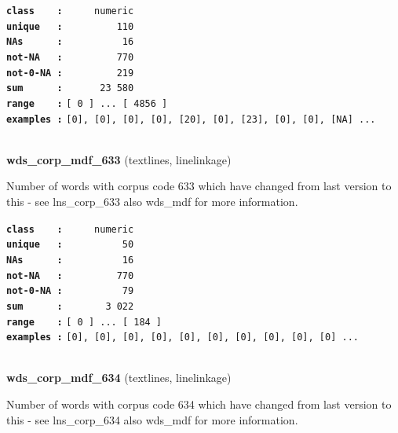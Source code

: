 \documentclass[]{article}
\begin{document}
\textbf{\texttt{class\ \ \ \ :}} \texttt{~~~~~numeric}\\
\textbf{\texttt{unique\ \ \ :}} \texttt{~~~~~~~~~110}\\
\textbf{\texttt{NAs\ \ \ \ \ \ :}} \texttt{~~~~~~~~~~16}\\
\textbf{\texttt{not-NA\ \ \ :}} \texttt{~~~~~~~~~770}\\
\textbf{\texttt{not-0-NA\ :}} \texttt{~~~~~~~~~219}\\
\textbf{\texttt{sum\ \ \ \ \ \ :}} \texttt{~~~~~~23~580}\\
\textbf{\texttt{range\ \ \ \ :}}
\texttt{{[}\ 0\ {]}\ ...\ {[}\ 4856\ {]}}\\
\textbf{\texttt{examples\ :}}
\texttt{{[}0{]},\ {[}0{]},\ {[}0{]},\ {[}0{]},\ {[}20{]},\ {[}0{]},\ {[}23{]},\ {[}0{]},\ {[}0{]},\ {[}NA{]}\ ...}\\

~

\textbf{wds\_corp\_mdf\_633} (textlines, linelinkage)

Number of words with corpus code 633 which have changed from last
version to this - see lns\_corp\_633 also wds\_mdf for more information.

\textbf{\texttt{class\ \ \ \ :}} \texttt{~~~~~numeric}\\
\textbf{\texttt{unique\ \ \ :}} \texttt{~~~~~~~~~~50}\\
\textbf{\texttt{NAs\ \ \ \ \ \ :}} \texttt{~~~~~~~~~~16}\\
\textbf{\texttt{not-NA\ \ \ :}} \texttt{~~~~~~~~~770}\\
\textbf{\texttt{not-0-NA\ :}} \texttt{~~~~~~~~~~79}\\
\textbf{\texttt{sum\ \ \ \ \ \ :}} \texttt{~~~~~~~3~022}\\
\textbf{\texttt{range\ \ \ \ :}}
\texttt{{[}\ 0\ {]}\ ...\ {[}\ 184\ {]}}\\
\textbf{\texttt{examples\ :}}
\texttt{{[}0{]},\ {[}0{]},\ {[}0{]},\ {[}0{]},\ {[}0{]},\ {[}0{]},\ {[}0{]},\ {[}0{]},\ {[}0{]},\ {[}0{]}\ ...}\\

~

\textbf{wds\_corp\_mdf\_634} (textlines, linelinkage)

Number of words with corpus code 634 which have changed from last
version to this - see lns\_corp\_634 also wds\_mdf for more information.
\end{document}
